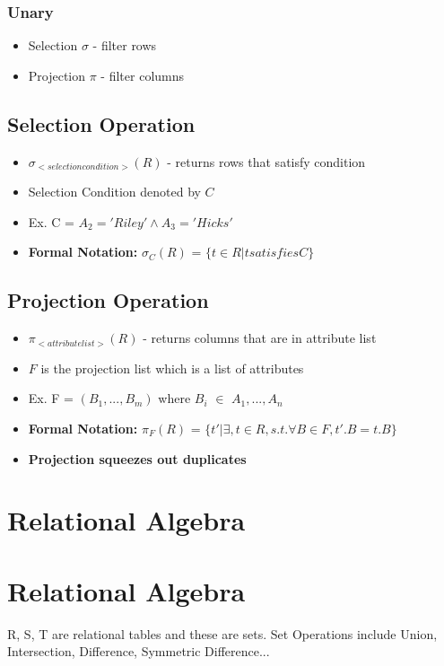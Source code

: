 \documentclass[twoside]{article}
\begin{document}
\subsubsection*{Unary}
\begin{itemize}
    \item Selection $\sigma$ - filter rows
    \item Projection $\pi$ - filter columns
\end{itemize}

\subsection*{Selection Operation}
\begin{itemize}
    \item $\sigma_{<selection condition>}(R)$ - returns rows that satisfy condition
    \item Selection Condition denoted by $C$
    \item Ex. C = $A_2 = 'Riley' \wedge A_3 = 'Hicks'$
    \item \textbf{Formal Notation:} $\sigma_C(R)$ = $\{t \in R | t  satisfies C\}$
\end{itemize}

\subsection*{Projection Operation}
\begin{itemize}
    \item $\pi_{<attribute list>}(R)$ - returns columns that are in attribute list
    \item $F$ is the projection list which is a list of attributes
    \item Ex. F = $(B_1,..., B_m)$ where $B_i$ $\in$ $A_1,..., A_n$
    \item \textbf{Formal Notation:} $\pi_F(R)$ = $\{t' | \exists,  t \in R, s.t. 
    \forall B \in F, t'.B=t.B\}$
    \item \textbf{Projection squeezes out duplicates}
\end{itemize}

\newpage
\section{Relational Algebra}

\section*{Relational Algebra}
R, S,  T are relational tables and these are sets. Set Operations include
Union, Intersection, Difference, Symmetric Difference...
\end{document}
